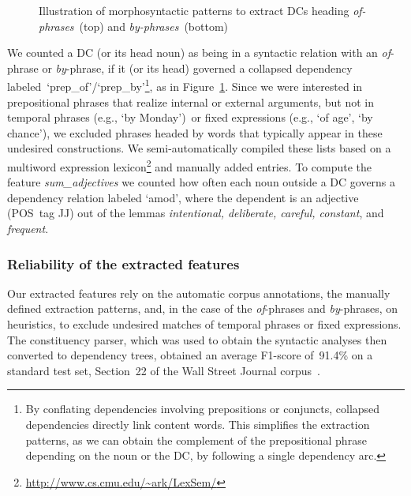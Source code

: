 \documentclass[output=paper]{langsci/langscibook}
\begin{document}
\begin{figure}[h]
   	\caption{Illustration of morphosyntactic patterns to extract DCs heading \textit{of-phrases}~(top) and \textit{by-phrases}~(bottom)}
	\label{fig:patterns-compound-phrases}
\end{figure}

We counted a DC (or its head noun) as being in a syntactic relation with an \textit{of}-phrase or \textit{by}-phrase,  if it (or its head) governed a collapsed dependency labeled~\lq prep\_of\rq/\lq prep\_by\rq\footnote{By conflating dependencies involving prepositions or conjuncts, collapsed dependencies directly link content words.
This simplifies the extraction patterns, as we can obtain the complement of the prepositional phrase depending on the noun or the DC, by following a single dependency arc.}, as in Figure~\ref{fig:patterns-compound-phrases}.
Since we were  interested in prepositional phrases that realize internal or external arguments, but not in 
temporal phrases (e.g., \lq by Monday\rq)~or fixed expressions (e.g., \lq of age\rq, \lq by chance\rq), we excluded phrases headed by words that typically appear in these undesired constructions. We semi-automatically compiled these lists based on a multiword expression lexicon\footnote{\url{http://www.cs.cmu.edu/~ark/LexSem/}} and manually added entries. To compute the feature \textit{sum\_adjectives} we counted how often each noun outside a DC governs a dependency relation labeled \lq amod\rq, where the dependent is an adjective (POS~tag JJ) out of the lemmas \textit{intentional, deliberate, careful, constant}, and \textit{frequent}.



\subsubsection{Reliability of the extracted features}
Our extracted features rely on the automatic corpus annotations, the manually defined extraction patterns, and, in the case of the \textit{of}-phrases and \textit{by}-phrases, on heuristics, to exclude undesired matches of temporal phrases or fixed expressions. 
The constituency parser, which was used to obtain the syntactic analyses then converted to dependency trees, obtained an average F1-score of~91.4\% on a standard test set, Section~22 of the Wall Street Journal corpus~\citep{Huang:10}.
\end{document}
